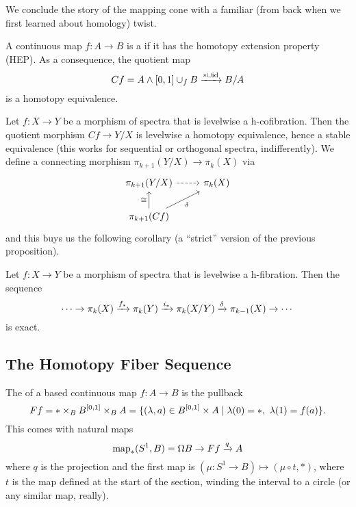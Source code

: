 

We conclude the story of the mapping cone with a familiar (from back when we first learned about homology) twist.

\begin{definition}
A continuous map $f:A\to B$ is a  if it has the homotopy extension property (HEP). As a consequence, the quotient map
\[Cf=A\wedge[0,1]\cup_f B\xrightarrow{*\cup\operatorname{id}}B/A\]
is a homotopy equivalence.
\end{definition}

Let $f:X\to Y$ be a morphism of spectra that is levelwise a h-cofibration. Then the quotient morphism $Cf\to Y/X$ is levelwise a homotopy equivalence, hence a stable equivalence (this works for sequential or orthogonal spectra, indifferently). We define a connecting morphism $\pi_{k+1}(Y/X)\to\pi_k(X)$ via
\[
\begin{tikzcd}
\pi_{k+1}(Y/X) \ar[r,dashed] & \pi_k(X)\\
\pi_{k+1}(Cf) \ar[u,"\cong"] \ar[ur,"\delta"'] & 
\end{tikzcd}
\]
and this buys us the following corollary (a \enquote{strict} version of the previous proposition).

\begin{corollary}\label{corollary:les-quotient}
Let $f:X\to Y$ be a morphism of spectra that is levelwise a h-fibration. Then the sequence
\[\cdots\to\pi_k(X)\xrightarrow{f_*}\pi_k(Y)\xrightarrow{i_*}\pi_k(X/Y)\xrightarrow{\delta}\pi_{k-1}(X)\to\cdots\]
is exact.
\end{corollary}

\subsection{The Homotopy Fiber Sequence}

\begin{construction}
The  of a based continuous map $f:A\to B$ is the pullback
\[Ff=*\times_B B^{[0,1]}\times_B A=\{(\lambda,a)\in B^{[0,1]}\times A\mid \lambda(0)=*,\ \lambda(1)=f(a)\}.\]
This comes with natural maps
\[\operatorname{map}_*(S^1,B)=\Omega B\to Ff\xrightarrow{q}A\]
where $q$ is the projection and the first map is $(\mu:S^1\to B)\mapsto(\mu\circ t,*)$, where $t$ is the map defined at the start of the section, winding the interval to a circle (or any similar map, really).
\end{construction}

